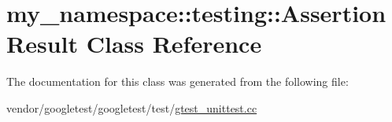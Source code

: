 \hypertarget{classmy__namespace_1_1testing_1_1AssertionResult}{}\section{my\+\_\+namespace\+:\+:testing\+:\+:Assertion\+Result Class Reference}
\label{classmy__namespace_1_1testing_1_1AssertionResult}


The documentation for this class was generated from the following file\+:\begin{DoxyCompactItemize}
\item 
vendor/googletest/googletest/test/\hyperlink{gtest__unittest_8cc}{gtest\+\_\+unittest.\+cc}\end{DoxyCompactItemize}
